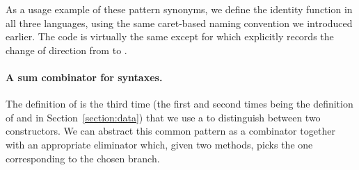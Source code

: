 \noindent
\begin{minipage}{0.99\textwidth}
\begin{minipage}{0.47\textwidth}
\end{minipage}
\begin{minipage}{0.52\textwidth}
\end{minipage}
\end{minipage}

As a usage example of these pattern synonyms, we define the identity
function in all three languages, using the
same caret-based naming convention we introduced earlier. The code
is virtually the same except for  which explicitly records
the change of direction from  to .

\noindent
\begin{minipage}{\textwidth}
\begin{minipage}{0.28\textwidth}
\end{minipage}
\begin{minipage}{0.34\textwidth}
\end{minipage}
\begin{minipage}{0.36\textwidth}
\end{minipage}
\end{minipage}


\paragraph*{A sum combinator for syntaxes.}\label{desccomb}

The definition of  is the third time (the first and second
times being the definition of  and  in
Section~\ref{section:data}) that we use a  to distinguish
between two constructors. We can abstract this common pattern as a combinator  together
with an appropriate eliminator  which, given two methods,
picks the one corresponding to the chosen branch.

\noindent
\begin{minipage}{0.95\textwidth}
\begin{minipage}[t]{0.42\textwidth}
\end{minipage}
\begin{minipage}[t]{0.57\textwidth}
\end{minipage}
\end{minipage}

